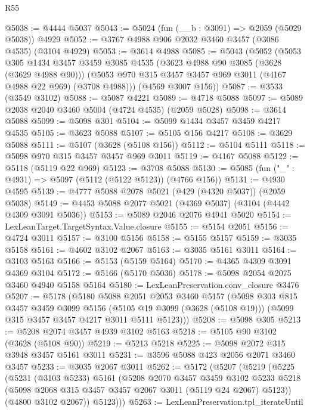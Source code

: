 \begin{lexlean}{R55}
\begin{coremodule}
@5038 := @4444 @5037
@5043 := @5024 (fun (__b : @3091) => @2059 (@5029 @5038)) @4929
@5052 := @3767 @4988 @906 @2032 @3460 @3457 (@3086 @4535) (@3104 @4929)
@5053 := @3614 @4988
@5085 := @5043
    (@5052
      (@5053
        @305
        @1434
        @3457
        @3459
        @3085
        @4535
        (@3623 @4988 @90 @3085 (@3628 (@3629 @4988 @90)))
        (@5053 @970 @315 @3457 @3457 @969 @3011 (@4167 @4988 @22 @969) (@3708 @4988)))
      (@4569 @3007 @156))
@5087 := @3533 (@3549 @3102)
@5088 := @5087 @4221
@5089 := @4718 @5088
@5097 := @5089 @2038 @2040 @3460 @5004 (@4724 @4535) (@2059 @5028)
@5098 := @3614 @5088
@5099 := @5098 @301
@5104 := @5099 @1434 @3457 @3459 @4217 @4535
@5105 := @3623 @5088
@5107 := @5105 @156 @4217
@5108 := @3629 @5088
@5111 := @5107 (@3628 (@5108 @156))
@5112 := @5104 @5111
@5118 := @5098 @970 @315 @3457 @3457 @969 @3011
@5119 := @4167 @5088
@5122 := @5118 (@5119 @22 @969)
@5123 := @3708 @5088
@5130 := @5085 (fun ("_" : @4931) => @5097 (@5112 (@5122 @5123)) (@4766 @156))
@5131 := @4930 @4595
@5139 := @4777 @5088 @2078 @5021 (@429 (@4320 @5037)) (@2059 @5038)
@5149 := @4453 @5088 @2077 @5021 (@4369 @5037) (@3104 (@4442 @4309 @3091 @5036))
@5153 := @5089 @2046 @2076 @4941 @5020
@5154 := LexLeanTarget.TargetSyntax.Value.closure
@5155 := @5154 @2051
@5156 := @4724 @3011
@5157 := @3100 @5156
@5158 := @5155 @5157
@5159 := @3035 @5158
@5161 := @4602 @3102 @2067
@5163 := @3035 @5161 @3011
@5164 := @3103 @5163
@5166 := @5153 (@5159 @5164)
@5170 := @4365 @4309 @3091 @4369 @3104
@5172 := @5166 (@5170 @5036)
@5178 := @5098 @2054 @2075 @3460 @4940 @5158 @5164
@5180 := LexLeanPreservation.conv_closure @3476
@5207 := @5178
    (@5180
      @5088
      @2051
      @2053
      @3460
      @5157
      (@5098
        @303
        @815
        @3457
        @3459
        @3099
        @5156
        (@5105 @19 @3099 (@3628 (@5108 @19)))
        (@5099 @315 @3457 @3457 @4217 @3011 @5111 @5123)))
@5208 := @5098 @305
@5213 := @5208 @2074 @3457 @4939 @3102 @5163
@5218 := @5105 @90 @3102 (@3628 (@5108 @90))
@5219 := @5213 @5218
@5225 := @5098 @2072 @315 @3948 @3457 @5161 @3011
@5231 := @3596 @5088 @423 @2056 @2071 @3460 @3457
@5233 := @3035 @2067 @3011
@5262 := @5172
    (@5207
      (@5219
        (@5225
          (@5231
            (@3103 @5233)
            @5161
            (@5208
              @2070
              @3457
              @3459
              @3102
              @5233
              @5218
              (@5098 @2068 @315 @3457 @3457 @2067 @3011 (@5119 @24 @2067) @5123))
            (@4800 @3102 @2067))
          @5123)))
@5263 := LexLeanPreservation.tpl_iterateUntil

\end{coremodule}
\end{lexlean}
